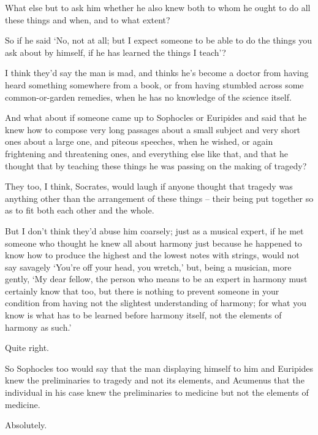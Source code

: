 What else but to ask him whether he also knew both to whom he
ought to do all these things and when, and to what extent?

So if he said ‘No, not at all; but I expect someone to be able
to do the things you ask about by himself, if he has  learned
the things I teach'?

I think they'd say the man is mad, and thinks he's become a
doctor from having heard something somewhere from a book, or from having
stumbled across some common-or-garden remedies, when he has no knowledge
of the science itself.

And what about if someone came up to Sophocles  or
Euripides and said that he knew how to compose very long passages about
a small subject and very short ones about a large one, and piteous
speeches, when he wished, or again  frightening and threatening
ones, and everything else like that, and that he thought that by
teaching these things he was passing on the making of tragedy?

They too, I think, Socrates, would laugh if anyone thought that
tragedy was anything other than the arrangement  of these things
-- their being put together so as to fit both each other and the whole.

But I don't think they'd abuse him coarsely; just as a musical
expert, if he met someone who thought he knew all about harmony just
because he happened to know how to  produce the highest and the
lowest notes with strings, would not say savagely ‘You're off your head,
you wretch,' but, being a musician, more gently, ‘My dear fellow, the
person who means to be an expert in harmony must certainly know that
 too, but there is nothing to prevent someone in your condition
from having not the slightest understanding of harmony; for what you
know is what has to be learned before harmony itself, not the elements
of harmony as such.'

Quite right.

 So Sophocles too would say that the man displaying
himself to him and Euripides knew the preliminaries to tragedy and not
its elements, and Acumenus that the individual in his case knew the
preliminaries to medicine but not the elements of medicine.

Absolutely.

